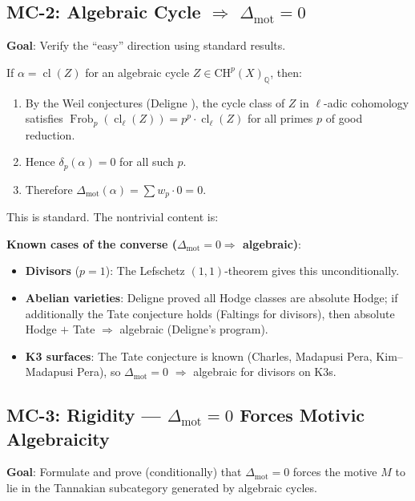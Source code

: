 \documentclass[11pt]{article}
\theoremstyle{definition}
\DeclareMathOperator{\Frob}{Frob}
\DeclareMathOperator{\cl}{cl}
\begin{document}
\subsection{MC-2: Algebraic Cycle $\Rightarrow$ $\Delta_{\mathrm{mot}} = 0$}

\textbf{Goal}: Verify the ``easy'' direction using standard results.

If $\alpha = \cl(Z)$ for an algebraic cycle $Z \in \mathrm{CH}^p(X)_{\mathbb{Q}}$, then:
\begin{enumerate}
  \item By the Weil conjectures (Deligne \cite{Deligne-Weil}), the cycle class of $Z$
    in $\ell$-adic cohomology satisfies $\Frob_p(\cl_\ell(Z)) = p^p \cdot \cl_\ell(Z)$
    for all primes $p$ of good reduction.
  \item Hence $\delta_p(\alpha) = 0$ for all such $p$.
  \item Therefore $\Delta_{\mathrm{mot}}(\alpha) = \sum w_p \cdot 0 = 0$.
\end{enumerate}

This is standard.  The nontrivial content is:

\textbf{Known cases of the converse ($\Delta_{\mathrm{mot}} = 0 \Rightarrow$ algebraic)}:
\begin{itemize}
  \item \textbf{Divisors} ($p = 1$): The Lefschetz $(1,1)$-theorem gives this unconditionally.
  \item \textbf{Abelian varieties}: Deligne proved all Hodge classes are absolute Hodge;
    if additionally the Tate conjecture holds (Faltings for divisors),
    then absolute Hodge $+$ Tate $\Rightarrow$ algebraic (Deligne's program).
  \item \textbf{K3 surfaces}: The Tate conjecture is known (Charles, Madapusi Pera, Kim--Madapusi Pera),
    so $\Delta_{\mathrm{mot}} = 0$ $\Rightarrow$ algebraic for divisors on K3s.
\end{itemize}

\subsection{MC-3: Rigidity --- $\Delta_{\mathrm{mot}} = 0$ Forces Motivic Algebraicity}

\textbf{Goal}: Formulate and prove (conditionally) that $\Delta_{\mathrm{mot}} = 0$ forces
the motive $M$ to lie in the Tannakian subcategory generated by algebraic cycles.
\end{document}
